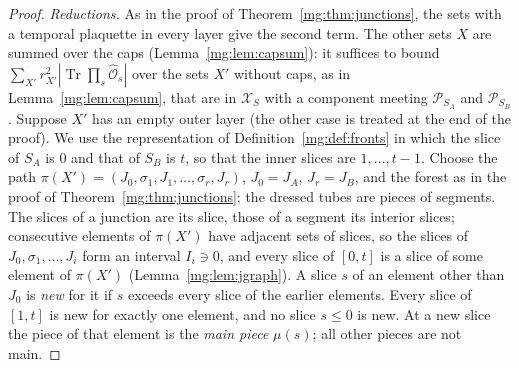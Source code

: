 \documentclass[11pt,a4paper]{article}
\theoremstyle{definition}
\theoremstyle{remark}
\DeclareMathOperator{\Tr}{Tr}
\newcommand{\cP}{\mathcal{P}}
\newcommand{\cX}{\mathcal{X}}
\begin{document}
\begin{proof}
\emph{Reductions.} As in the proof of Theorem~\ref{mg:thm:junctions}, the sets with a temporal plaquette in every layer give the second term. The other
sets $X$ are summed over the caps (Lemma~\ref{mg:lem:capsum}): it suffices to bound $\sum_{X'}r_{X'}^2|\Tr\prod_s\hat{\mathcal O}_s|$ over the sets $X'$ without
caps, as in Lemma~\ref{mg:lem:capsum}, that are in $\cX_S$ with a component meeting $\cP_{S_A}$ and $\cP_{S_B}$. Suppose $X'$ has an empty outer layer (the other case is treated at the end of the
proof). We use the representation of Definition~\ref{mg:def:fronts} in which the slice of $S_A$ is $0$ and that of $S_B$ is $t$, so that the inner slices are $1,\dots,t-1$. Choose the path
$\pi(X')=(J_0,\sigma_1,J_1,\dots,\sigma_r,J_r)$, $J_0=J_A$, $J_r=J_B$, and the forest as in the proof of Theorem~\ref{mg:thm:junctions}; the dressed tubes are pieces of
segments. The slices of a junction are its slice, those of a segment its interior slices; consecutive elements of $\pi(X')$ have adjacent sets of slices, so the
slices of $J_0,\sigma_1,\dots,J_i$ form an interval $I_i\ni0$, and every slice of $[0,t]$ is a slice of some element of $\pi(X')$ (Lemma~\ref{mg:lem:jgraph}). A
slice $s$ of an element other than $J_0$ is \emph{new} for it if $s$ exceeds every slice of the earlier elements. Every slice of $[1,t]$ is new for
exactly one element, and no slice $s\le0$ is new. At a new slice the piece of that element is the \emph{main piece} $\mu(s)$; all other pieces are
not main.


\end{proof}
\end{document}
